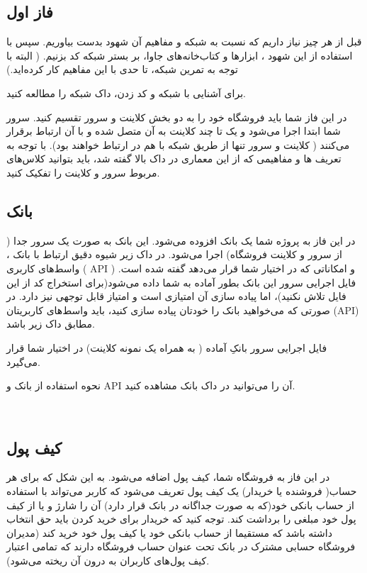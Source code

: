 \documentclass[]{article}
\begin{document}
\subsection*{{\titr فاز اول}}

قبل از هر چیز نیاز داریم که نسبت به شبکه و مفاهیم آن شهود بدست بیاوریم. سپس با استفاده از این شهود ، ابزار‌ها و کتاب‌خانه‌های جاوا، بر بستر شبکه کد بزنیم. ( البته با توجه به تمرین شبکه، تا حدی با این مفاهیم کار کرده‌اید.)


برای آشنایی با شبکه و کد زدن، \textcolor{CustomColor}{داک شبکه} را مطالعه کنید.


در این فاز شما باید فروشگاه خود را به دو بخش کلاینت و سرور تقسیم کنید. سرور شما ابتدا اجرا می‌شود و یک تا چند کلاینت به آن متصل شده و با آن ارتباط برقرار می‌کنند ( کلاینت و سرور تنها از طریق شبکه با هم در ارتباط خواهند بود). با توجه به تعریف ها و مفاهیمی که از این معماری در داک بالا گفته شد، باید  بتوانید کلاس‌های مربوط سرور و کلاینت را تفکیک کنید.



\subsection*{{\titr بانک}}

در این فاز به پروژه شما یک بانک افزوده می‌شود. این بانک به صورت یک سرور جدا ( از سرور و کلاینت فروشگاه‌) اجرا می‌شود. در داک زیر شیوه دقیق ارتباط با بانک ، واسط‌های کاربری  ( API )‌ و امکاناتی که در اختیار شما قرار می‌دهد گفته شده است. فایل اجرایی سرور این بانک بطور آماده به شما داده می‌شود(برای استخراج کد از این فایل تلاش نکنید)، اما پیاده سازی آن امتیازی است و امتیاز قابل توجهی نیز دارد. در صورتی که می‌خواهید بانک را خودتان پیاده سازی کنید، باید واسط‌های کاربریتان (API)‌ مطابق داک زیر باشد.

فایل اجرایی سرور بانکِ آماده ( به همراه یک نمونه کلاینت) در اختیار شما قرار می‌گیرد.

نحوه استفاده از بانک و API آن را می‌توانید در \textcolor{CustomColor}{داک بانک} مشاهده کنید.

\newpage


 \Large \textbf{\\
}
\subsection*{{\titr کیف پول}}
در این فاز به \textcolor{CustomColor}{فروشگاه} شما، کیف پول اضافه می‌شود. به این شکل که برای هر حساب( فروشنده یا خریدار) یک کیف پول تعریف می‌شود که کاربر می‌تواند با استفاده از حساب بانکی خود(که به صورت جداگانه در بانک قرار دارد) آن را شارژ و یا از کیف پول خود مبلغی را برداشت کند. توجه کنید که خریدار برای خرید کردن باید حق انتخاب داشته باشد که مستقیما از حساب بانکی خود یا کیف پول خود خرید کند (مدیران فروشگاه حسابی مشترک در بانک تحت عنوان حساب فروشگاه دارند که تمامی اعتبار کیف پول‌های کاربران به درون آن ریخته می‌شود).
\end{document}
